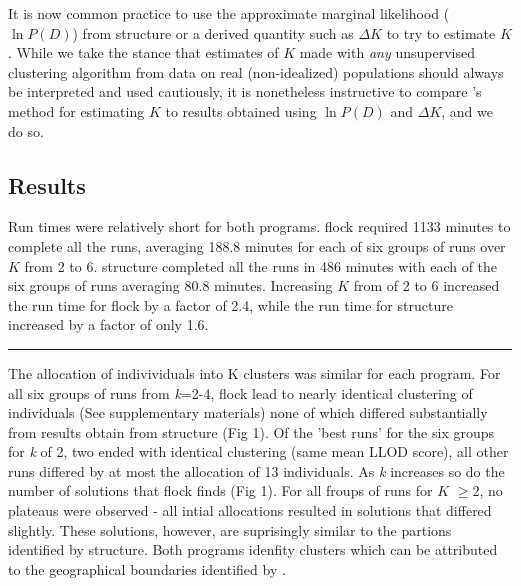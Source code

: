It is now common practice to use the approximate marginal likelihood ($\ln P(D)$) from {\sc structure}
or a derived quantity such as $\Delta K$ \citep{Evannoetal2005} to try to estimate $K$.
While we take the stance that estimates of $K$ made with {\em any} unsupervised clustering algorithm
from data on real (non-idealized) populations should always be interpreted and used
cautiously, it is nonetheless instructive to compare \citet{Duc&Tur2012}'s method for
estimating $K$ to results obtained using $\ln P(D)$ and $\Delta K$, and we do so. 


\subsection*{Results} 
Run times were relatively short for both programs. {\sc flock} 
required 1133 minutes to complete all the runs, averaging 188.8 minutes for 
each of six groups of runs over $K$ from 2 to 6. {\sc structure} completed all the runs in 
486 minutes with each of the six groups of runs averaging 80.8 minutes. Increasing
$K$ from of 2 to 6 increased the run time for {\sc flock} by a factor of 2.4, while the run time 
for {\sc structure} increased by a factor of only 1.6.
\hrule

The allocation of indivividuals into K clusters was similar for each program. For all six groups 
of runs from \textit{k}=2-4, {\sc flock} lead to nearly identical clustering of individuals 
(See supplementary materials) none of which differed substantially from results obtain from 
{\sc structure} (Fig 1). Of the 'best runs' for the six groups for \textit{k} of 2, two  
ended with identical clustering (same mean LLOD score), all other runs 
differed by at most the allocation of 13 individuals. As 
\textit{k} increases so do the number of solutions
that {\sc flock} finds (Fig 1). For all froups of runs for $K$ $\geq 2$, no plateaus were observed - all intial 
allocations resulted in solutions that differed slightly. These solutions, however, are suprisingly similar to
 the partions identified by {\sc structure}. Both programs idenfity clusters 
which can be attributed to the geographical boundaries identified by \citet{Garzaetal_norcal}.

